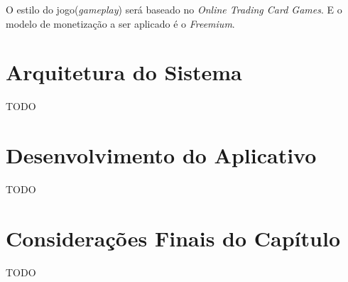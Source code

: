 O estilo do jogo(\textit{gameplay}) será baseado no \textit{Online Trading Card Games}.
E o modelo de monetização a ser aplicado é o \textit{Freemium}.


\section{Arquitetura do Sistema}

TODO


\section{Desenvolvimento do Aplicativo}

TODO


\section{Considerações Finais do Capítulo}

TODO

